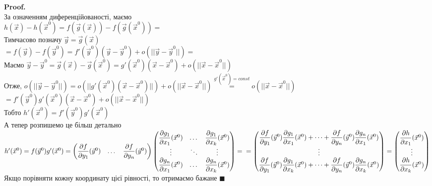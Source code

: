 \documentclass[a4paper, 14pt]{extarticle}
\def\departial#1#2{\dfrac{\partial {#1}}{\partial {#2}}}
\def\bigline{\vspace{5mm}\\}
\theoremstyle{theoremdd}
\theoremstyle{theoremdd}
\theoremstyle{theoremdd}
\theoremstyle{theoremdd}
\theoremstyle{theoremdd}
\theoremstyle{theoremdd}
\theoremstyle{theoremdd}
\newenvironment{pf}{\vspace*{-3mm} \textbf{Proof. \\}}{$\blacksquare$}
\begin{document}
\begin{pf}
За означенням диференційованості, маємо\\
$h(\vec{x}) - h(\vec{x}^0) = f(\vec{g}(\vec{x})) - f(\vec{g}(\vec{x}^0)) =$\\
Тимчасово позначу $\vec{y} = \vec{g}(\vec{x})$\\
$=f(\vec{y}) - f(\vec{y}^0) = f'(\vec{y}^0) (\vec{y} - \vec{y}^0) + o(||\vec{y} - \vec{y}^0||) \boxed{=}$\\
Маємо $\vec{y} - \vec{y}^0 = \vec{g}(\vec{x}) - \vec{g}(\vec{x}^0) = g'(\vec{x}^0)(\vec{x}-\vec{x}^0) + o(||\vec{x}-\vec{x}^0||)$\\
Отже, $o(||\vec{y}-\vec{y}^0||) = o(||g'(\vec{x}^0)(\vec{x}-\vec{x}^0)||) + o(||\vec{x}-\vec{x}^0||) \overset{g'(\vec{x}^0) = const}{=} o(||\vec{x}-\vec{x}^0||)$\\
$\boxed{=} f'(\vec{y}^0)g'(\vec{x}^0)(\vec{x}-\vec{x}^0) + o(||\vec{x} - \vec{x}^0||)$\\
Тобто $h'(\vec{x}^0) = f'(\vec{y}^0) g'(\vec{x}^0)$
\bigline
А тепер розпишемо це більш детально\\
$h'(\vec{x}^0) = f(\vec{y}^0) g'(\vec{x}^0) = \begin{pmatrix}
\departial{f}{y_1}(\vec{y}^0) & \dots & \departial{f}{y_n}(\vec{y}^0)
\end{pmatrix} \begin{pmatrix}
 \departial{g_1}{x_1}(\vec{x}^0) & \dots & \departial{g_1}{x_k}(\vec{x}^0) \\
 \vdots & \ddots & \vdots \\
 \departial{g_n}{x_1}(\vec{x}^0) & \dots & \departial{g_n}{x_k}(\vec{x}^0)
\end{pmatrix} = \\
= \begin{pmatrix}
\departial{f}{y_1}(\vec{y}^0)\departial{g_1}{x_1}(\vec{x}^0) + \dots + \departial{f}{y_n}(\vec{y}^0)\departial{g_n}{x_1}(\vec{x}^0)\\
\vdots \\
\departial{f}{y_1}(\vec{y}^0)\departial{g_1}{x_k}(\vec{x}^0) + \dots + \departial{f}{y_n}(\vec{y}^0)\departial{g_n}{x_k}(\vec{x}^0)\\
\end{pmatrix} = \begin{pmatrix}
\departial{h}{x_1}(\vec{x}^0) \\ \vdots \\ \departial{h}{x_k}(\vec{x}^0)
\end{pmatrix}$\\
Якщо порівняти кожну координату цієї рівності, то отримаємо бажане
\end{pf}
\end{document}

